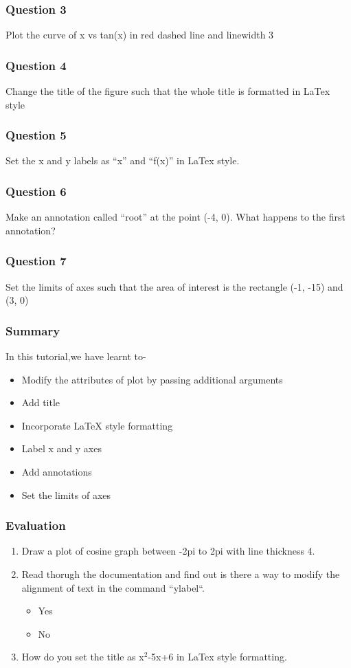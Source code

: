 \documentclass[presentation]{beamer}
\begin{document}
\begin{frame}
\frametitle{Question 3}
\label{sec-5}

  Plot the curve of x vs tan(x) in red dashed line and linewidth 3
\end{frame}
\begin{frame}
\frametitle{Question 4}
\label{sec-6}

  Change the title of the figure such that the whole title is
  formatted in LaTex style
\end{frame}
\begin{frame}
\frametitle{Question 5}
\label{sec-7}

  Set the x and y labels as ``x'' and ``f(x)'' in LaTex style.
\end{frame}
\begin{frame}
\frametitle{Question 6}
\label{sec-8}

  Make an annotation called ``root'' at the point (-4, 0). What happens
  to the first annotation?
\end{frame}
\begin{frame}
\frametitle{Question 7}
\label{sec-9}

  Set the limits of axes such that the area of interest is the
  rectangle (-1, -15) and (3, 0)
\end{frame}
\begin{frame}
\frametitle{Summary}
\label{sec-10}

  In this tutorial,we have learnt to-

\begin{itemize}
\item Modify the attributes of plot by passing additional arguments
\item Add title
\item Incorporate \LaTeX{} style formatting
\item Label x and y axes
\item Add annotations
\item Set the limits of axes
\end{itemize}
\end{frame}
\begin{frame}
\frametitle{Evaluation}
\label{sec-11}


\begin{enumerate}
\item Draw a plot of cosine graph between -2pi to 2pi with line thickness 4.
\item Read thorugh the documentation and find out is there a way to modify the
     alignment of text in the command ``ylabel``.
\begin{itemize}
\item Yes
\item No
\end{itemize}
\item How do you set the title as x$^2$-5x+6 in LaTex style formatting.
\end{enumerate}
\end{frame}
\end{document}

